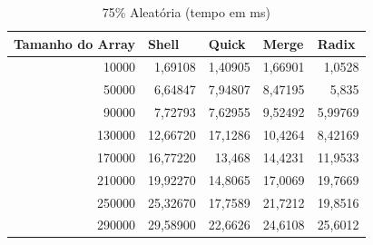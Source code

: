 \documentclass[a4paper, 12pt]{article}
\begin{document}
\begin{longtable}[c]{@{}rrrrr@{}}
	\caption{75\% Aleatória (tempo em ms)}
	\label{tab:aleatoria752-table}\\
	\toprule
	\multicolumn{1}{l}{\textbf{Tamanho do Array}} & \multicolumn{1}{l}{\textbf{Shell}} & \multicolumn{1}{l}{\textbf{Quick}} & \multicolumn{1}{l}{\textbf{Merge}} & \multicolumn{1}{l}{\textbf{Radix}} \\* \midrule
	\endfirsthead
	\endhead
	\multicolumn{1}{|r|}{10000}                   & \multicolumn{1}{r|}{1,69108}       & \multicolumn{1}{r|}{1,40905}       & \multicolumn{1}{r|}{1,66901}       & \multicolumn{1}{r|}{1,0528}        \\* \midrule
	\multicolumn{1}{|r|}{50000}                   & \multicolumn{1}{r|}{6,64847}       & \multicolumn{1}{r|}{7,94807}       & \multicolumn{1}{r|}{8,47195}       & \multicolumn{1}{r|}{5,835}         \\* \midrule
	\multicolumn{1}{|r|}{90000}                   & \multicolumn{1}{r|}{7,72793}       & \multicolumn{1}{r|}{7,62955}       & \multicolumn{1}{r|}{9,52492}       & \multicolumn{1}{r|}{5,99769}       \\* \midrule
	\multicolumn{1}{|r|}{130000}                  & \multicolumn{1}{r|}{12,66720}      & \multicolumn{1}{r|}{17,1286}       & \multicolumn{1}{r|}{10,4264}       & \multicolumn{1}{r|}{8,42169}       \\* \midrule
	\multicolumn{1}{|r|}{170000}                  & \multicolumn{1}{r|}{16,77220}      & \multicolumn{1}{r|}{13,468}        & \multicolumn{1}{r|}{14,4231}       & \multicolumn{1}{r|}{11,9533}       \\* \midrule
	\multicolumn{1}{|r|}{210000}                  & \multicolumn{1}{r|}{19,92270}      & \multicolumn{1}{r|}{14,8065}       & \multicolumn{1}{r|}{17,0069}       & \multicolumn{1}{r|}{19,7669}       \\* \midrule
	\multicolumn{1}{|r|}{250000}                  & \multicolumn{1}{r|}{25,32670}      & \multicolumn{1}{r|}{17,7589}       & \multicolumn{1}{r|}{21,7212}       & \multicolumn{1}{r|}{19,8516}       \\* \midrule
	\multicolumn{1}{|r|}{290000}                  & \multicolumn{1}{r|}{29,58900}      & \multicolumn{1}{r|}{22,6626}       & \multicolumn{1}{r|}{24,6108}       & \multicolumn{1}{r|}{25,6012}       \\* \midrule

\end{longtable}
\end{document}
